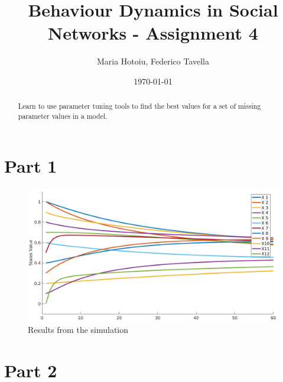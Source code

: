 \documentclass[a4paper]{article}
\title{Behaviour Dynamics in Social Networks - Assignment 4}
\author{Maria Hotoiu, Federico Tavella}
\date{\today}
\begin{document}
\maketitle

\begin{abstract}
Learn to use parameter tuning tools to find the best values for a set of missing parameter values in a model.
\end{abstract}

\section{Part 1}

\begin{figure}[!htpb]
\center
\includegraphics[width=\textwidth]{res/img/part1}
\caption{Results from the simulation}
\label{fig:part1}
\end{figure}

\section{Part 2}
\end{document}

